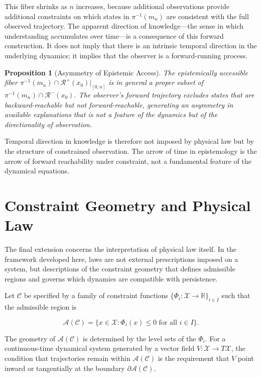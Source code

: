 \documentclass[12pt, a4paper, oneside]{article}
\theoremstyle{plain}
\newtheorem{proposition}[theorem]{Proposition}
\theoremstyle{definition}
\theoremstyle{remark}
\newcommand{\X}{\mathcal{X}}
\newcommand{\C}{\mathcal{C}}
\newcommand{\R}{\mathcal{R}}
\newcommand{\A}{\mathcal{A}}
\newcommand{\proj}{\pi}
\begin{document}
This fiber shrinks as $n$ increases, because additional observations provide additional constraints on which states in $\proj^{-1}(m_n)$ are consistent with the full observed trajectory. The apparent direction of knowledge---the sense in which understanding accumulates over time---is a consequence of this forward construction. It does not imply that there is an intrinsic temporal direction in the underlying dynamics; it implies that the observer is a forward-running process.

\begin{proposition}[Asymmetry of Epistemic Access]
\label{prop:asymmetry}
The epistemically accessible fiber $\proj^{-1}(m_n) \cap \R^+(x_0)|_{[0,n]}$ is in general a proper subset of $\proj^{-1}(m_n) \cap \R^-(x_0)$. The observer's forward trajectory excludes states that are backward-reachable but not forward-reachable, generating an asymmetry in available explanations that is not a feature of the dynamics but of the directionality of observation.
\end{proposition}

Temporal direction in knowledge is therefore not imposed by physical law but by the structure of constrained observation. The arrow of time in epistemology is the arrow of forward reachability under constraint, not a fundamental feature of the dynamical equations.

\section{Constraint Geometry and Physical Law}

The final extension concerns the interpretation of physical law itself. In the framework developed here, laws are not external prescriptions imposed on a system, but descriptions of the constraint geometry that defines admissible regions and governs which dynamics are compatible with persistence.

Let $\C$ be specified by a family of constraint functions $\{\Phi_i : \X \to \mathbb{R}\}_{i \in I}$ such that the admissible region is

\begin{equation}
\A(\C) = \{x \in \X : \Phi_i(x) \leq 0 \text{ for all } i \in I\}.
\end{equation}

The geometry of $\A(\C)$ is determined by the level sets of the $\Phi_i$. For a continuous-time dynamical system generated by a vector field $V : \X \to T\X$, the condition that trajectories remain within $\A(\C)$ is the requirement that $V$ point inward or tangentially at the boundary $\partial \A(\C)$.
\end{document}
